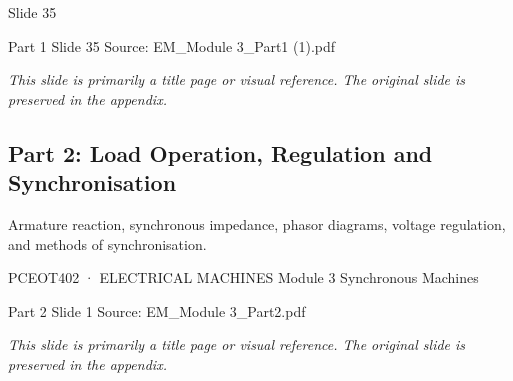 \documentclass[11pt,a4paper]{article}
\begin{document}
\begin{mdframed}[roundcorner=9pt,backgroundcolor=white,linecolor=anthBlue,linewidth=1pt,innerleftmargin=12pt,innerrightmargin=12pt,innertopmargin=10pt,innerbottommargin=10pt,skipabove=8pt,skipbelow=10pt]
{\HeadingFont\fontsize{15}{18}\selectfont\color{anthDark}Slide 35\par}
{\color{anthMid}\small Part 1 \textbullet{} Slide 35 \textbullet{} Source: EM\_Module 3\_Part1 (1).pdf\par}
\vspace{0.5em}
{\small
\textit{This slide is primarily a title page or visual reference. The original slide is preserved in the appendix.}

}
\end{mdframed}

\subsection{Part 2: Load Operation, Regulation and Synchronisation}
Armature reaction, synchronous impedance, phasor diagrams, voltage regulation, and methods of synchronisation.

\begin{mdframed}[roundcorner=9pt,backgroundcolor=white,linecolor=anthGreen,linewidth=1pt,innerleftmargin=12pt,innerrightmargin=12pt,innertopmargin=10pt,innerbottommargin=10pt,skipabove=8pt,skipbelow=10pt]
{\HeadingFont\fontsize{15}{18}\selectfont\color{anthDark}PCEOT402 · ELECTRICAL MACHINES Module 3 Synchronous Machines\par}
{\color{anthMid}\small Part 2 \textbullet{} Slide 1 \textbullet{} Source: EM\_Module 3\_Part2.pdf\par}
\vspace{0.5em}
{\small
\textit{This slide is primarily a title page or visual reference. The original slide is preserved in the appendix.}

}
\end{mdframed}
\end{document}
